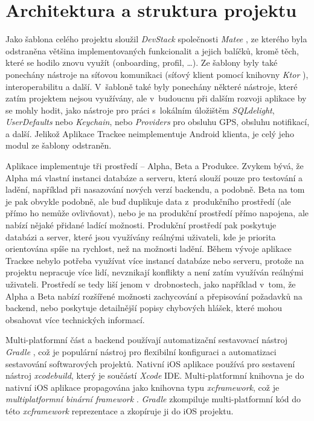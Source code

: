 \section{Architektura a struktura projektu}

Jako šablona celého projektu sloužil \emph{DevStack} společnosti \emph{Matee} \cite{matee-devstack}, ze kterého byla odstraněna většina implementovaných funkcionalit a jejich balíčků, kromě těch, které se hodilo znovu využít (onboarding, profil, \dots). Ze šablony byly také ponechány nástroje na síťovou komunikaci (síťový klient pomocí knihovny \emph{Ktor} \cite{ktor}), interoperabilitu a další. V~šabloně také byly ponechány některé nástroje, které zatím projektem nejsou využívány, ale v~budoucnu při dalším rozvoji aplikace by se mohly hodit, jako nástroje pro práci s~lokálním úložištěm \emph{SQLdelight}, \emph{UserDefaults} nebo \emph{Keychain}, nebo \emph{Providers} pro obsluhu GPS, obsluhu notifikací, a další. Jelikož Aplikace Trackee neimplementuje Android klienta, je celý jeho modul ze šablony odstraněn.

Aplikace implementuje tři prostředí – Alpha, Beta a Produkce. Zvykem bývá, že Alpha má vlastní instanci databáze a serveru, která slouží pouze pro testování a ladění, například při nasazování nových verzí backendu, a podobně. Beta na tom je pak obvykle podobně, ale buď duplikuje data z~produkčního prostředí (ale přímo ho nemůže ovlivňovat), nebo je na produkční prostředí přímo napojena, ale nabízí nějaké přidané ladící možnosti. Produkční prostředí pak poskytuje databázi a server, které jsou využívány reálnými uživateli, kde je priorita orientována spíše na rychlost, než na možnosti ladění. Během vývoje aplikace Trackee nebylo potřeba využívat více instancí databáze nebo serveru, protože na projektu nepracuje více lidí, nevznikají konflikty a není zatím využíván reálnými uživateli. Prostředí se tedy liší jenom v~drobnostech, jako například v~tom, že Alpha a Beta nabízí rozšířené možnosti zachycování a přepisování požadavků na backend, nebo poskytuje detailnější popisy chybových hlášek, které mohou obsahovat více technických informací. 

Multi-platformní část a backend používají automatizační sestavovací nástroj \emph{Gradle} \cite{gradle}, což je populární nástroj pro flexibilní konfiguraci a automatizaci sestavování softwarových projektů. Nativní iOS aplikace používá pro sestavení nástroj \emph{xcodebuild}, který je součástí \emph{Xcode} IDE. Multi-platformní knihovna je do nativní iOS aplikace propagována jako knihovna typu \emph{xcframework}, což je \emph{multiplatformní binární framework} \cite{xcframework}. \emph{Gradle} zkompiluje multi-platformní kód do této \emph{xcframework} reprezentace a zkopíruje ji do iOS projektu.


